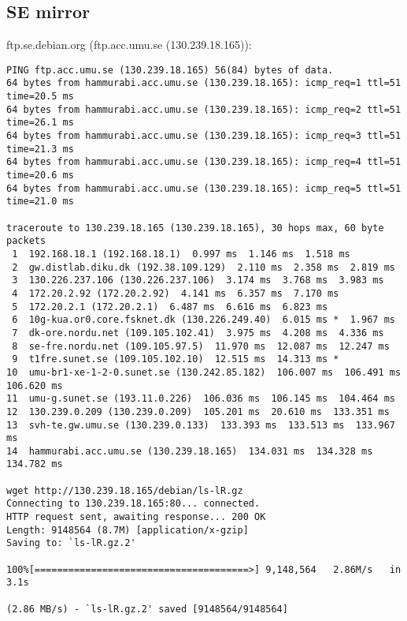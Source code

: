 \documentclass{acm_proc_article-sp}
\begin{document}
\subsection{SE mirror}
ftp.se.debian.org (ftp.acc.umu.se (130.239.18.165)):
\begin{verbatim}
PING ftp.acc.umu.se (130.239.18.165) 56(84) bytes of data.
64 bytes from hammurabi.acc.umu.se (130.239.18.165): icmp_req=1 ttl=51 time=20.5 ms
64 bytes from hammurabi.acc.umu.se (130.239.18.165): icmp_req=2 ttl=51 time=26.1 ms
64 bytes from hammurabi.acc.umu.se (130.239.18.165): icmp_req=3 ttl=51 time=21.3 ms
64 bytes from hammurabi.acc.umu.se (130.239.18.165): icmp_req=4 ttl=51 time=20.6 ms
64 bytes from hammurabi.acc.umu.se (130.239.18.165): icmp_req=5 ttl=51 time=21.0 ms

traceroute to 130.239.18.165 (130.239.18.165), 30 hops max, 60 byte packets
 1  192.168.18.1 (192.168.18.1)  0.997 ms  1.146 ms  1.518 ms
 2  gw.distlab.diku.dk (192.38.109.129)  2.110 ms  2.358 ms  2.819 ms
 3  130.226.237.106 (130.226.237.106)  3.174 ms  3.768 ms  3.983 ms
 4  172.20.2.92 (172.20.2.92)  4.141 ms  6.357 ms  7.170 ms
 5  172.20.2.1 (172.20.2.1)  6.487 ms  6.616 ms  6.823 ms
 6  10g-kua.or0.core.fsknet.dk (130.226.249.40)  6.015 ms *  1.967 ms
 7  dk-ore.nordu.net (109.105.102.41)  3.975 ms  4.208 ms  4.336 ms
 8  se-fre.nordu.net (109.105.97.5)  11.970 ms  12.087 ms  12.247 ms
 9  t1fre.sunet.se (109.105.102.10)  12.515 ms  14.313 ms *
10  umu-br1-xe-1-2-0.sunet.se (130.242.85.182)  106.007 ms  106.491 ms  106.620 ms
11  umu-g.sunet.se (193.11.0.226)  106.036 ms  106.145 ms  104.464 ms
12  130.239.0.209 (130.239.0.209)  105.201 ms  20.610 ms  133.351 ms
13  svh-te.gw.umu.se (130.239.0.133)  133.393 ms  133.513 ms  133.967 ms
14  hammurabi.acc.umu.se (130.239.18.165)  134.031 ms  134.328 ms  134.782 ms

wget http://130.239.18.165/debian/ls-lR.gz
Connecting to 130.239.18.165:80... connected.
HTTP request sent, awaiting response... 200 OK
Length: 9148564 (8.7M) [application/x-gzip]
Saving to: `ls-lR.gz.2'

100%[======================================>] 9,148,564   2.86M/s   in 3.1s    

(2.86 MB/s) - `ls-lR.gz.2' saved [9148564/9148564]
\end{verbatim}
\newpage
$ $
\newpage
\end{document}
